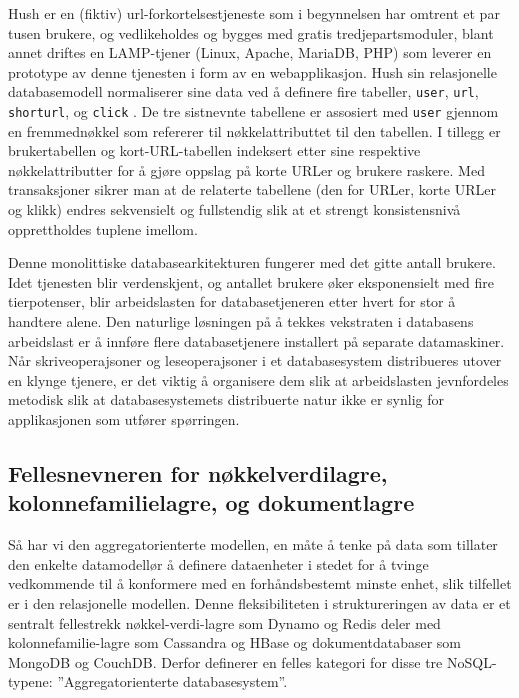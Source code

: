 Hush er en (fiktiv) url-forkortelsestjeneste som i begynnelsen har omtrent et par tusen brukere, og vedlikeholdes og bygges med gratis tredjepartsmoduler, blant annet driftes en LAMP-tjener (Linux, Apache, MariaDB, PHP) som leverer en prototype av denne tjenesten i form av en webapplikasjon. Hush sin relasjonelle databasemodell normaliserer sine data ved å definere fire tabeller, \texttt{user}, \texttt{url}, \texttt{shorturl}, og \texttt{click} \citep{george2011}. De tre sistnevnte tabellene er assosiert med \texttt{user} gjennom en fremmednøkkel som refererer til nøkkelattributtet til den tabellen. I tillegg er brukertabellen og kort-URL-tabellen indeksert etter sine respektive nøkkelattributter for å gjøre oppslag på korte URLer og brukere raskere. Med transaksjoner sikrer man at de relaterte tabellene (den for URLer, korte URLer og klikk) endres sekvensielt og fullstendig slik at et strengt konsistensnivå opprettholdes tuplene imellom.

Denne monolittiske databasearkitekturen fungerer med det gitte antall brukere. Idet tjenesten blir verdenskjent, og antallet brukere øker eksponensielt med fire tierpotenser, blir arbeidslasten for databasetjeneren etter hvert for stor å handtere alene. Den naturlige løsningen på å tekkes vekstraten i databasens arbeidslast er å innføre flere databasetjenere installert på separate datamaskiner. Når skriveoperajsoner og leseoperajsoner i et databasesystem distribueres utover en klynge tjenere, er det viktig å organisere dem slik at arbeidslasten jevnfordeles metodisk slik at databasesystemets distribuerte natur ikke er synlig for applikasjonen som utfører spørringen. 

\subsection{Fellesnevneren for nøkkelverdilagre, kolonnefamilielagre, og dokumentlagre}

Så har vi den aggregatorienterte modellen, en måte å tenke på data som tillater den enkelte datamodellør å definere dataenheter i stedet for å tvinge vedkommende til å konformere med en forhåndsbestemt minste enhet, slik tilfellet er i den relasjonelle modellen. Denne fleksibiliteten i struktureringen av data er et sentralt fellestrekk nøkkel-verdi-lagre som Dynamo og Redis deler med kolonnefamilie-lagre som Cassandra og HBase og dokumentdatabaser som MongoDB og CouchDB. Derfor definerer \cite{sadalage2013} en felles kategori for disse tre NoSQL-typene: ''Aggregatorienterte databasesystem''.

